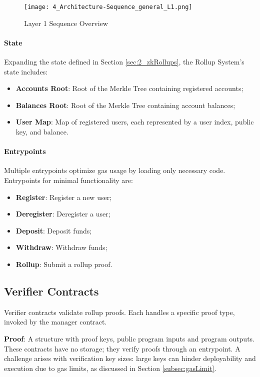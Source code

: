 \begin{figure}[ht]
  \centering
  \texttt{[image: 4\_Architecture-Sequence\_general\_L1.png]}
  \caption{Layer 1 Sequence Overview}
  \label{fig:Layer1sequencediagram}
\end{figure}

\paragraph{State}
Expanding the state defined in Section \ref{sec:2_zkRollups}, the Rollup System's state includes:
\begin{itemize}
  \item \textbf{Accounts Root}: Root of the Merkle Tree containing registered accounts;
  \item \textbf{Balances Root}: Root of the Merkle Tree containing account balances;
  \item \textbf{User Map}: Map of registered users, each represented by a user index, public key, and balance.
\end{itemize}

\paragraph{Entrypoints}
Multiple entrypoints optimize gas usage by loading only necessary code. Entrypoints for minimal functionality are:
\begin{itemize}
  \item \textbf{Register}: Register a new user;
  \item \textbf{Deregister}: Deregister a user;
  \item \textbf{Deposit}: Deposit funds;
  \item \textbf{Withdraw}: Withdraw funds;
  \item \textbf{Rollup}: Submit a rollup proof.
\end{itemize}

\subsection{Verifier Contracts\label{sec:designverifiercontracts}}
Verifier contracts validate rollup proofs. Each handles a specific proof type, invoked by the manager contract.

\textbf{Proof}: A structure with proof keys, public program inputs and program outputs.
\newline These contracts have no storage; they verify proofs through an entrypoint. A challenge arises with verification key sizes: large keys can hinder deployability and execution due to gas limits, as discussed in Section \ref{subsec:gasLimit}. 

